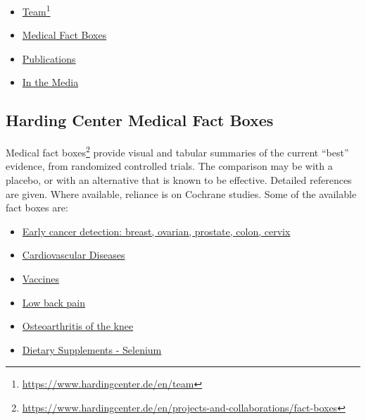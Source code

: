 \documentclass[
  10pt,
  b5paper]{book}
\providecommand{\tightlist}{%
  \setlength{\itemsep}{0pt}\setlength{\parskip}{0pt}}
\begin{document}
\begin{itemize}
\tightlist
\item
  \href{https://www.hardingcenter.de/en/team}{Team}\footnote{\url{https://www.hardingcenter.de/en/team}}
\item
  \href{https://www.hardingcenter.de/en/transfer-and-impact/fact-boxes}{Medical Fact Boxes}
\item
  \href{https://www.hardingcenter.de/en/the-harding-center/publications/scientific-publications}{Publications}
\item
  \href{https://www.hardingcenter.de/en/harding-center/media}{In the Media}
\end{itemize}

\hypertarget{harding-center-medical-fact-boxes}{%
\subsection*{Harding Center Medical Fact Boxes}\label{harding-center-medical-fact-boxes}}

Medical fact boxes\footnote{\url{https://www.hardingcenter.de/en/projects-and-collaborations/fact-boxes}} provide visual and tabular summaries of the current
``best'' evidence, from randomized controlled trials. The comparison
may be with a placebo, or with an alternative that is known to be
effective. Detailed references are given. Where available, reliance
is on Cochrane studies. Some of the available fact boxes are:

\begin{itemize}
\tightlist
\item
  \href{https://www.hardingcenter.de/en/projects-and-collaborations/fact-boxes/early-detection-cancer}{Early cancer detection: breast, ovarian, prostate, colon, cervix}
\item
  \href{https://www.hardingcenter.de/en/projects-and-collaborations/fact-boxes/cardiovascular-diseases}{Cardiovascular Diseases}
\item
  \href{https://www.hardingcenter.de/en/projects-and-collaborations/fact-boxes/vaccines}{Vaccines}
\item
  \href{https://www.hardingcenter.de/en/projects-and-collaborations/fact-boxes/imaging-tests-low-back-pain}{Low back pain}
\item
  \href{https://www.hardingcenter.de/en/projects-and-collaborations/fact-boxes/osteoarthritis-knee}{Osteoarthritis of the knee}
\item
  \href{https://www.hardingcenter.de/en/projects-and-collaborations/fact-boxes/dietary-supplements}{Dietary Supplements - Selenium}
\end{itemize}
\end{document}

